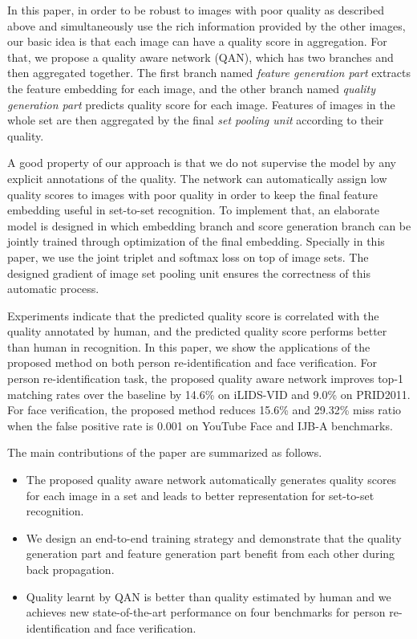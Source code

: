 \documentclass[10pt,twocolumn,letterpaper]{article}
\begin{document}
In this paper, in order to be robust to images with poor quality as described above and simultaneously use the rich information provided by the other images, our basic idea is that each image can have a quality score in aggregation. For that, we propose a quality aware network (QAN), which has two branches and then aggregated together. The first branch named \emph{feature generation part} extracts the feature embedding for each image, and the other branch named \emph{quality generation part} predicts quality score for each image. Features of images in the whole set are then aggregated by the final \emph{set pooling unit} according to their quality. 

A good property of our approach is that we do not supervise the  model by any explicit annotations of the quality. The network can automatically assign low quality scores to images with poor quality in order to keep the final feature embedding useful in set-to-set recognition. To implement that, an elaborate model is designed in which embedding branch and score generation branch can be jointly trained through optimization of the final embedding.  Specially in this paper, we use the joint triplet and softmax loss on top of image sets. The designed gradient of image set pooling unit ensures the correctness of this automatic process. 

Experiments indicate that the predicted quality score is correlated with the quality annotated by human, and the predicted quality score performs better than human in recognition. In this paper, we show the applications of the proposed method on both person re-identification and face verification. For person re-identification task, the proposed quality aware network improves top-1 matching rates over the baseline by 14.6\% on iLIDS-VID  and 9.0\% on PRID2011. For face verification, the proposed method reduces 15.6\% and 29.32\% miss ratio  when the false positive rate is 0.001 on YouTube Face and IJB-A benchmarks.

The main contributions of the paper are summarized as follows.
\begin{itemize}
\item The proposed quality aware network automatically generates quality scores for each image in a set and leads to better representation for set-to-set recognition.

\item We design an end-to-end training strategy and demonstrate that the quality generation part and feature generation part benefit from each other during back propagation.



\item  Quality learnt by QAN is better than quality estimated by human and we achieves new state-of-the-art performance on four benchmarks for person re-identification and face verification.
\end{itemize}
\end{document}
